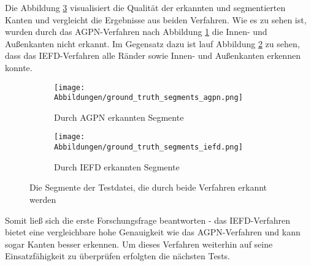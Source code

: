 Die Abbildung \ref{fig: segments_comparision_grnd_trth} visualisiert die Qualität der erkannten und segmentierten Kanten und vergleicht die Ergebnisse aus beiden Verfahren. Wie es zu sehen ist, wurden durch das AGPN-Verfahren nach Abbildung \ref{fig: agpn_segments_grnd_trth} die Innen- und Außenkanten nicht erkannt. Im Gegensatz dazu ist lauf Abbildung \ref{fig: iefd_segments_grnd_trth} zu sehen, dass das IEFD-Verfahren alle Ränder sowie Innen- und Außenkanten erkennen konnte. 

\begin{figure}[h]
	\centering
	\begin{subfigure}[h]{0.49\textwidth}
		\texttt{[image: Abbildungen/ground\_truth\_segments\_agpn.png]}
		\centering
		\caption{Durch AGPN erkannten Segmente}
		\label{fig: agpn_segments_grnd_trth}
	\end{subfigure}
	\hfil
	\begin{subfigure}[h]{0.49\textwidth}
		\texttt{[image: Abbildungen/ground\_truth\_segments\_iefd.png]}
		\centering
		\caption{Durch IEFD erkannten Segmente}
		\label{fig: iefd_segments_grnd_trth}
	\end{subfigure}
	\caption{Die Segmente der Testdatei, die durch beide Verfahren erkannt werden}
	\label{fig: segments_comparision_grnd_trth}
\end{figure}

Somit ließ sich die erste Forschungsfrage beantworten - das IEFD-Verfahren bietet eine vergleichbare hohe Genauigkeit wie das AGPN-Verfahren und kann sogar Kanten besser erkennen. Um dieses Verfahren weiterhin auf seine Einsatzfähigkeit zu überprüfen erfolgten die nächsten Tests.

